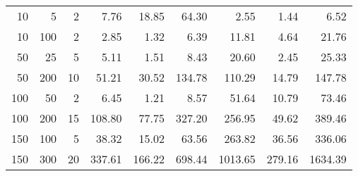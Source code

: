\begin{tabular}{rrrrrrrrr}
\toprule
  10 &    5 &   2 &   7.76 &  18.85 &  64.30 &    2.55 &   1.44 &    6.52 \\
  10 &  100 &   2 &   2.85 &   1.32 &   6.39 &   11.81 &   4.64 &   21.76 \\
  50 &   25 &   5 &   5.11 &   1.51 &   8.43 &   20.60 &   2.45 &   25.33 \\
  50 &  200 &  10 &  51.21 &  30.52 & 134.78 &  110.29 &  14.79 &  147.78 \\
 100 &   50 &   2 &   6.45 &   1.21 &   8.57 &   51.64 &  10.79 &   73.46 \\
 100 &  200 &  15 & 108.80 &  77.75 & 327.20 &  256.95 &  49.62 &  389.46 \\
 150 &  100 &   5 &  38.32 &  15.02 &  63.56 &  263.82 &  36.56 &  336.06 \\
 150 &  300 &  20 & 337.61 & 166.22 & 698.44 & 1013.65 & 279.16 & 1634.39 \\
\bottomrule
\end{tabular}
